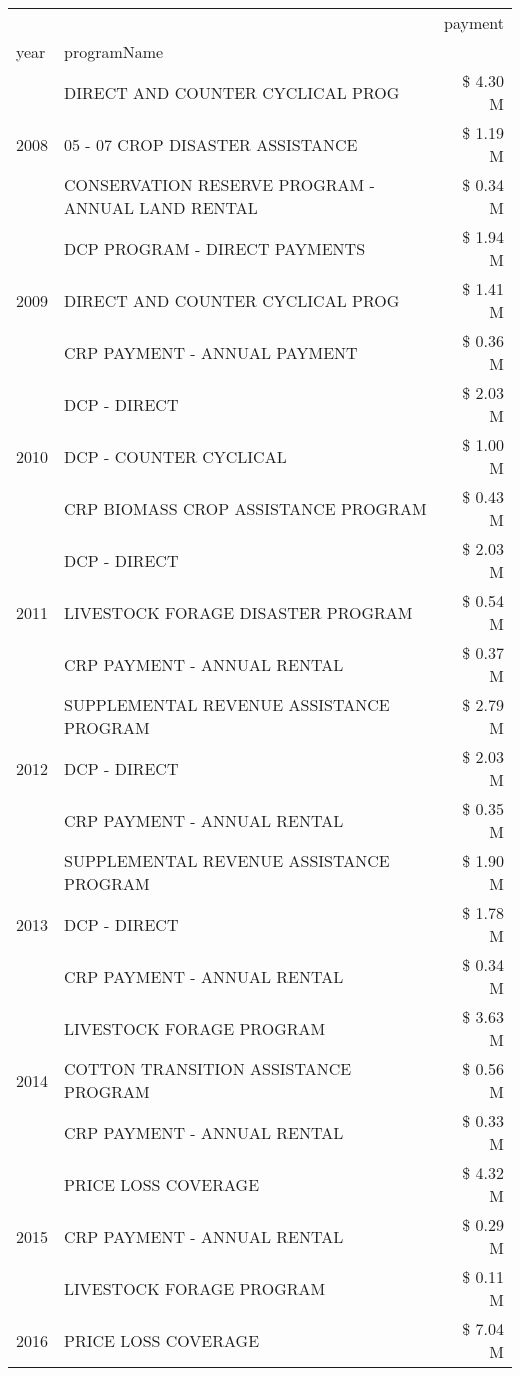 \begin{tabular}{llr}
\toprule
 &  & payment \\
year & programName &  \\
\midrule
\multirow[t]{3}{*}{2008} & DIRECT AND COUNTER CYCLICAL PROG & \$ 4.30 M \\
 & 05 - 07 CROP DISASTER ASSISTANCE & \$ 1.19 M \\
 & CONSERVATION RESERVE PROGRAM - ANNUAL LAND RENTAL & \$ 0.34 M \\
\cline{1-3}
\multirow[t]{3}{*}{2009} & DCP PROGRAM - DIRECT PAYMENTS & \$ 1.94 M \\
 & DIRECT AND COUNTER CYCLICAL PROG & \$ 1.41 M \\
 & CRP PAYMENT - ANNUAL PAYMENT & \$ 0.36 M \\
\cline{1-3}
\multirow[t]{3}{*}{2010} & DCP - DIRECT & \$ 2.03 M \\
 & DCP - COUNTER CYCLICAL & \$ 1.00 M \\
 & CRP BIOMASS CROP ASSISTANCE PROGRAM & \$ 0.43 M \\
\cline{1-3}
\multirow[t]{3}{*}{2011} & DCP - DIRECT & \$ 2.03 M \\
 & LIVESTOCK FORAGE DISASTER PROGRAM & \$ 0.54 M \\
 & CRP PAYMENT - ANNUAL RENTAL & \$ 0.37 M \\
\cline{1-3}
\multirow[t]{3}{*}{2012} & SUPPLEMENTAL REVENUE ASSISTANCE PROGRAM & \$ 2.79 M \\
 & DCP - DIRECT & \$ 2.03 M \\
 & CRP PAYMENT - ANNUAL RENTAL & \$ 0.35 M \\
\cline{1-3}
\multirow[t]{3}{*}{2013} & SUPPLEMENTAL REVENUE ASSISTANCE PROGRAM & \$ 1.90 M \\
 & DCP - DIRECT & \$ 1.78 M \\
 & CRP PAYMENT - ANNUAL RENTAL & \$ 0.34 M \\
\cline{1-3}
\multirow[t]{3}{*}{2014} & LIVESTOCK FORAGE PROGRAM & \$ 3.63 M \\
 & COTTON TRANSITION ASSISTANCE PROGRAM & \$ 0.56 M \\
 & CRP PAYMENT - ANNUAL RENTAL & \$ 0.33 M \\
\cline{1-3}
\multirow[t]{3}{*}{2015} & PRICE LOSS COVERAGE & \$ 4.32 M \\
 & CRP PAYMENT - ANNUAL RENTAL & \$ 0.29 M \\
 & LIVESTOCK FORAGE PROGRAM & \$ 0.11 M \\
\cline{1-3}
\multirow[t]{3}{*}{2016} & PRICE LOSS COVERAGE & \$ 7.04 M \\

\end{tabular}
